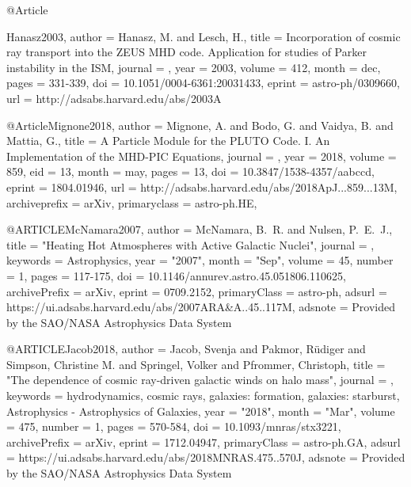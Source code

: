 \documentclass[useAMS,usenatbib]{mnras}
\begin{document}
{{{{{@Article{Hanasz2003,
  author  = {Hanasz, M. and Lesch, H.},
  title   = {Incorporation of cosmic ray transport into the ZEUS MHD code. Application for studies of Parker instability in the ISM},
  journal = {\aap},
  year    = {2003},
  volume  = {412},
  month   = dec,
  pages   = {331-339},
  doi     = {10.1051/0004-6361:20031433},
  eprint  = {astro-ph/0309660},
  url     = {http://adsabs.harvard.edu/abs/2003A}

@Article{Mignone2018,
  author        = {Mignone, A. and Bodo, G. and Vaidya, B. and Mattia, G.},
  title         = {A Particle Module for the PLUTO Code. I. An Implementation of the MHD-PIC Equations},
  journal       = {\apj},
  year          = {2018},
  volume        = {859},
  eid           = {13},
  month         = may,
  pages         = {13},
  doi           = {10.3847/1538-4357/aabccd},
  eprint        = {1804.01946},
  url           = {http://adsabs.harvard.edu/abs/2018ApJ...859...13M},
  archiveprefix = {arXiv},
  primaryclass  = {astro-ph.HE},
}

@ARTICLE{McNamara2007,
       author = {{McNamara}, B.~R. and {Nulsen}, P.~E.~J.},
        title = "{Heating Hot Atmospheres with Active Galactic Nuclei}",
      journal = {\araa},
     keywords = {Astrophysics},
         year = "2007",
        month = "Sep",
       volume = {45},
       number = {1},
        pages = {117-175},
          doi = {10.1146/annurev.astro.45.051806.110625},
archivePrefix = {arXiv},
       eprint = {0709.2152},
 primaryClass = {astro-ph},
       adsurl = {https://ui.adsabs.harvard.edu/abs/2007ARA&A..45..117M},
      adsnote = {Provided by the SAO/NASA Astrophysics Data System}
}

@ARTICLE{Jacob2018,
       author = {{Jacob}, Svenja and {Pakmor}, R{\"u}diger and {Simpson}, Christine M. and
         {Springel}, Volker and {Pfrommer}, Christoph},
        title = "{The dependence of cosmic ray-driven galactic winds on halo mass}",
      journal = {\mnras},
     keywords = {hydrodynamics, cosmic rays, galaxies: formation, galaxies: starburst, Astrophysics - Astrophysics of Galaxies},
         year = "2018",
        month = "Mar",
       volume = {475},
       number = {1},
        pages = {570-584},
          doi = {10.1093/mnras/stx3221},
archivePrefix = {arXiv},
       eprint = {1712.04947},
 primaryClass = {astro-ph.GA},
       adsurl = {https://ui.adsabs.harvard.edu/abs/2018MNRAS.475..570J},
      adsnote = {Provided by the SAO/NASA Astrophysics Data System}
}

}}}}}}
\end{document}
